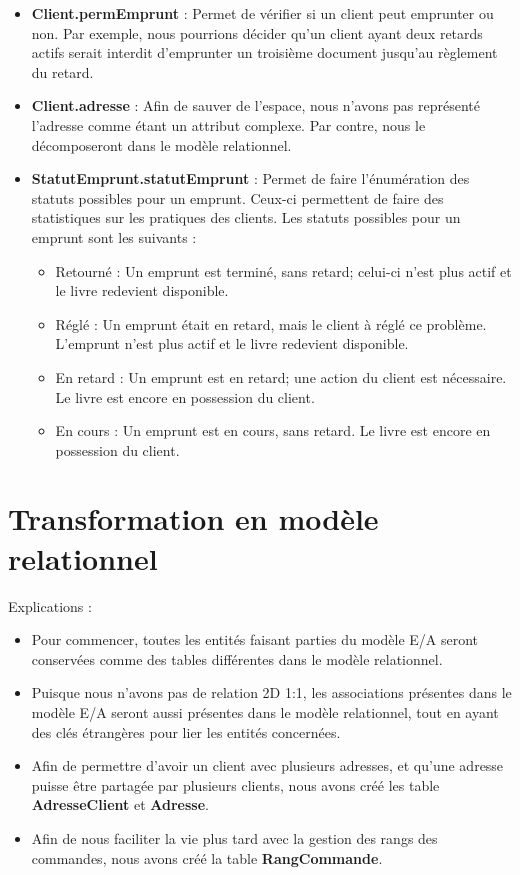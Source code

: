 \documentclass{article}
\begin{document}
\begin{itemize}
\item \textbf{Client.permEmprunt} : Permet de vérifier si un client peut
  emprunter ou non. Par exemple, nous pourrions décider qu'un client ayant deux
  retards actifs serait interdit d'emprunter un troisième document jusqu'au
  règlement du retard.
\item \textbf{Client.adresse} : Afin de sauver de l'espace, nous n'avons pas
  représenté l'adresse comme étant un attribut complexe. Par contre, nous
  le décomposeront dans le modèle relationnel.
\item \textbf{StatutEmprunt.statutEmprunt} : Permet de faire l'énumération des
  statuts possibles pour un emprunt. Ceux-ci permettent de faire des
  statistiques sur les pratiques des clients. Les statuts possibles pour un
  emprunt sont les suivants :
  \begin{itemize}[label=$\bullet$]
  \item Retourné : Un emprunt est terminé, sans retard; celui-ci n'est
    plus actif et le livre redevient disponible.
  \item Réglé : Un emprunt était en retard, mais le client à réglé ce
    problème. L'emprunt n'est plus actif et le livre redevient disponible.
  \item En retard : Un emprunt est en retard; une action du client est
    nécessaire. Le livre est encore en possession du client.
  \item En cours : Un emprunt est en cours, sans retard. Le livre est encore en
    possession du client.
  \end{itemize}
  
\end{itemize}


\section{Transformation en modèle relationnel}
Explications :
\begin{itemize}
\item Pour commencer, toutes les entités faisant parties du modèle E/A seront
  conservées comme des tables différentes dans le modèle relationnel.
\item Puisque nous n'avons pas de relation 2D 1:1, les associations présentes
  dans le modèle E/A seront aussi présentes dans le modèle relationnel, tout en
  ayant des clés étrangères pour lier les entités concernées.
\item Afin de permettre d'avoir un client avec plusieurs adresses, et qu'une
  adresse puisse être partagée par plusieurs clients, nous avons créé les table
  \textbf{AdresseClient} et \textbf{Adresse}.
\item Afin de nous faciliter la vie plus tard avec la gestion des rangs des
  commandes, nous avons créé la table \textbf{RangCommande}.
\end{itemize}
\end{document}
